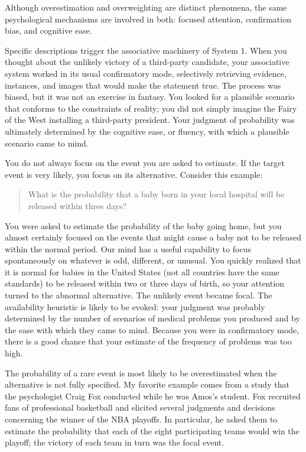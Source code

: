\documentclass[11pt]{article}
\begin{document}
Although overestimation and overweighting are distinct phenomena, the same psychological mechanisms are involved in both: focused attention, confirmation bias, and cognitive ease.

Specific descriptions trigger the associative machinery of System 1. When you thought about the unlikely victory of a third-party candidate, your associative system worked in its usual confirmatory mode, selectively retrieving evidence, instances, and images that would make the statement true. The process was biased, but it was not an exercise in fantasy. You looked for a plausible scenario that conforms to the constraints of reality; you did not simply imagine the Fairy of the West installing a third-party president. Your judgment of probability was ultimately determined by the cognitive ease, or fluency, with which a plausible scenario came to mind.

You do not always focus on the event you are asked to estimate. If the target event is very likely, you focus on its alternative. Consider this example:

\begin{quote}
What is the probability that a baby born in your local hospital will be released within three days?
\end{quote}

You were asked to estimate the probability of the baby going home, but you almost certainly focused on the events that might cause a baby not to be released within the normal period. Our mind has a useful capability to focus spontaneously on whatever is odd, different, or unusual. You quickly realized that it is normal for babies in the United States (not all countries have the same standards) to be released within two or three days of birth, so your attention turned to the abnormal alternative. The unlikely event became focal. The availability heuristic is likely to be evoked: your judgment was probably determined by the number of scenarios of medical problems you produced and by the ease with which they came to mind. Because you were in confirmatory mode, there is a good chance that your estimate of the frequency of problems was too high.

The probability of a rare event is most likely to be overestimated when the alternative is not fully specified. My favorite example comes from a study that the psychologist Craig Fox conducted while he was Amos’s student. Fox recruited fans of professional basketball and elicited several judgments and decisions concerning the winner of the NBA playoffs. In particular, he asked them to estimate the probability that each of the eight participating teams would win the playoff; the victory of each team in turn was the focal event.
\end{document}
